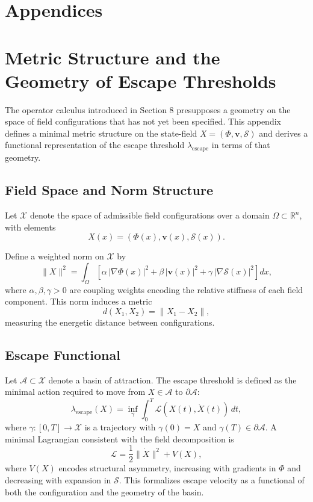 \documentclass[11pt, a4paper]{article}
\begin{document}
\newpage 
\section*{Appendices}
\appendix

\section{Metric Structure and the Geometry of Escape Thresholds}

The operator calculus introduced in Section 8 presupposes a geometry on the space of field configurations that has not yet been specified. This appendix defines a minimal metric structure on the state-field $X = (\Phi, \mathbf{v}, \mathcal{S})$ and derives a functional representation of the escape threshold $\lambda_{\mathrm{escape}}$ in terms of that geometry.

\subsection{Field Space and Norm Structure}

Let $\mathcal{X}$ denote the space of admissible field configurations over a domain $\Omega \subset \mathbb{R}^n$, with elements
\begin{equation}
X(x) = (\Phi(x), \mathbf{v}(x), \mathcal{S}(x)).
\end{equation}

Define a weighted norm on $\mathcal{X}$ by
\begin{equation}
\|X\|^2 = \int_{\Omega} \left[ \alpha\, |\nabla \Phi(x)|^2 + \beta\, |\mathbf{v}(x)|^2 + \gamma\, |\nabla \mathcal{S}(x)|^2 \right] dx,
\end{equation}
where $\alpha, \beta, \gamma > 0$ are coupling weights encoding the relative stiffness of each field component. This norm induces a metric
\begin{equation}
d(X_1, X_2) = \|X_1 - X_2\|,
\end{equation}
measuring the energetic distance between configurations.

\subsection{Escape Functional}

Let $\mathcal{A} \subset \mathcal{X}$ denote a basin of attraction. The escape threshold is defined as the minimal action required to move from $X \in \mathcal{A}$ to $\partial \mathcal{A}$:
\begin{equation}
\lambda_{\mathrm{escape}}(X) = \inf_{\gamma} \int_0^T \mathcal{L}(X(t), \dot{X}(t)) \, dt,
\end{equation}
where $\gamma : [0,T] \to \mathcal{X}$ is a trajectory with $\gamma(0)=X$ and $\gamma(T) \in \partial \mathcal{A}$. A minimal Lagrangian consistent with the field decomposition is
\begin{equation}
\mathcal{L} = \frac{1}{2} \|\dot{X}\|^2 + V(X),
\end{equation}
where $V(X)$ encodes structural asymmetry, increasing with gradients in $\Phi$ and decreasing with expansion in $\mathcal{S}$. This formalizes escape velocity as a functional of both the configuration and the geometry of the basin.
\end{document}
